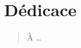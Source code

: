 \chapter*{D\'edicace}
\begin{SingleSpace}
\begin{quote}
\vspace{4cm}
\begin{center}
{\Large \calligra \`A \ldots}
\end{center}
\end{quote}
\end{SingleSpace}
\clearpage

